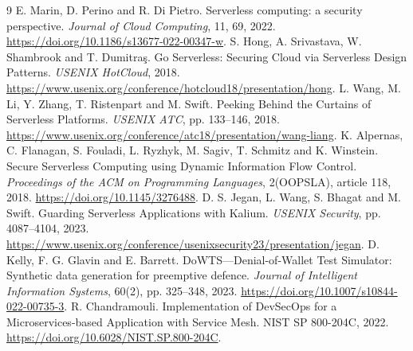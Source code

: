 \documentclass[11pt,a4paper]{article}
\begin{document}
\begin{thebibliography}{9}
 E. Marin, D. Perino and R. Di Pietro. Serverless computing: a security perspective. \emph{Journal of Cloud Computing}, 11, 69, 2022. \url{https://doi.org/10.1186/s13677-022-00347-w}.
 S. Hong, A. Srivastava, W. Shambrook and T. Dumitra\c{s}. Go Serverless: Securing Cloud via Serverless Design Patterns. \emph{USENIX HotCloud}, 2018. \url{https://www.usenix.org/conference/hotcloud18/presentation/hong}.
 L. Wang, M. Li, Y. Zhang, T. Ristenpart and M. Swift. Peeking Behind the Curtains of Serverless Platforms. \emph{USENIX ATC}, pp. 133--146, 2018. \url{https://www.usenix.org/conference/atc18/presentation/wang-liang}.
 K. Alpernas, C. Flanagan, S. Fouladi, L. Ryzhyk, M. Sagiv, T. Schmitz and K. Winstein. Secure Serverless Computing using Dynamic Information Flow Control. \emph{Proceedings of the ACM on Programming Languages}, 2(OOPSLA), article 118, 2018. \url{https://doi.org/10.1145/3276488}.
 D. S. Jegan, L. Wang, S. Bhagat and M. Swift. Guarding Serverless Applications with Kalium. \emph{USENIX Security}, pp. 4087--4104, 2023. \url{https://www.usenix.org/conference/usenixsecurity23/presentation/jegan}.
 D. Kelly, F. G. Glavin and E. Barrett. DoWTS---Denial-of-Wallet Test Simulator: Synthetic data generation for preemptive defence. \emph{Journal of Intelligent Information Systems}, 60(2), pp. 325--348, 2023. \url{https://doi.org/10.1007/s10844-022-00735-3}.
 R. Chandramouli. Implementation of DevSecOps for a Microservices-based Application with Service Mesh. NIST SP 800-204C, 2022. \url{https://doi.org/10.6028/NIST.SP.800-204C}.
\end{thebibliography}
\end{document}
